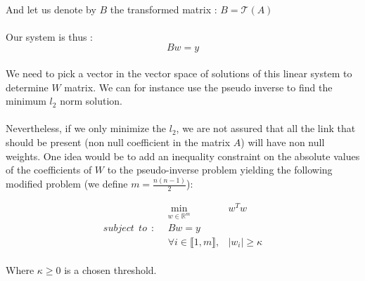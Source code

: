 \documentclass{article}
\begin{document}
\begin{appendices}
\paragraph{}
And let us denote by $B$ the transformed matrix : $B = \mathcal{T}(A)$

\paragraph{}
Our system is thus : 
$$Bw = y$$

\paragraph{}
We need to pick a vector in the vector space of solutions of this linear system to determine $W$ matrix. We can for instance use the pseudo inverse to find the minimum $l_2$ norm solution.

\paragraph{}
Nevertheless, if we only minimize the $l_2$, we are not assured that all the link that should be present (non null coefficient in the matrix $A$) will have non null weights. One idea would be to add an inequality constraint on the absolute values of the coefficients of $W$ to the pseudo-inverse problem yielding the following modified problem (we define $m = \frac{n(n-1)}{2}$):

\begin{eqnarray*}
&\min_{w \in \mathbb{R}^m}& w^T w\\
subject~~to~~:~~&Bw = y& \\
&\forall i \in \llbracket 1, m \rrbracket , &|w_i| \geq \kappa
\end{eqnarray*}

\paragraph{}
Where $\kappa \geq 0$ is a chosen threshold.


\end{appendices}


\printbibliography
\end{document}
